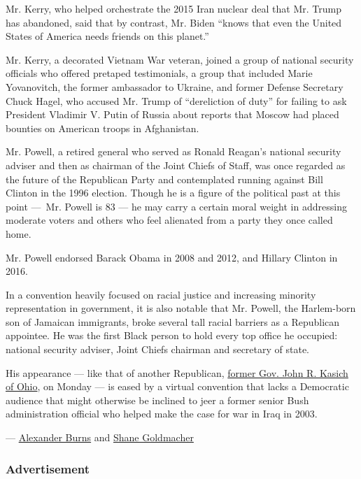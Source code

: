 Mr. Kerry, who helped orchestrate the 2015 Iran nuclear deal that Mr.
Trump has abandoned, said that by contrast, Mr. Biden ``knows that even
the United States of America needs friends on this planet.''

Mr. Kerry, a decorated Vietnam War veteran, joined a group of national
security officials who offered pretaped testimonials, a group that
included Marie Yovanovitch, the former ambassador to Ukraine, and former
Defense Secretary Chuck Hagel, who accused Mr. Trump of ``dereliction of
duty'' for failing to ask President Vladimir V. Putin of Russia about
reports that Moscow had placed bounties on American troops in
Afghanistan.

Mr. Powell, a retired general who served as Ronald Reagan's national
security adviser and then as chairman of the Joint Chiefs of Staff, was
once regarded as the future of the Republican Party and contemplated
running against Bill Clinton in the 1996 election. Though he is a figure
of the political past at this point ---~Mr. Powell is 83 --- he may
carry a certain moral weight in addressing moderate voters and others
who feel alienated from a party they once called home.

Mr. Powell endorsed Barack Obama in 2008 and 2012, and Hillary Clinton
in 2016.

In a convention heavily focused on racial justice and increasing
minority representation in government, it is also notable that Mr.
Powell, the Harlem-born son of Jamaican immigrants, broke several tall
racial barriers as a Republican appointee. He was the first Black person
to hold every top office he occupied: national security adviser, Joint
Chiefs chairman and secretary of state.

His appearance --- like that of another Republican,
\href{https://www.nytimes3xbfgragh.onion/2020/08/17/us/politics/john-kasich-biden.html}{former
Gov. John R. Kasich of Ohio}, on Monday --- is eased by a virtual
convention that lacks a Democratic audience that might otherwise be
inclined to jeer a former senior Bush administration official who helped
make the case for war in Iraq in 2003.

---
\href{https://www.nytimes3xbfgragh.onion/by/alexander-burns}{Alexander
Burns} and
\href{https://www.nytimes3xbfgragh.onion/by/shane-goldmacher}{Shane
Goldmacher}

\hypertarget{advertisement-1}{%
\subsubsection{Advertisement}\label{advertisement-1}}

